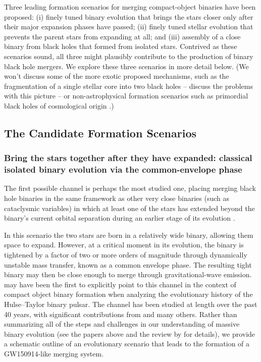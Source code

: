 \documentclass[iop,onecolumn]{revtex4}
\begin{document}
Three leading formation scenarios for merging compact-object binaries have been proposed: (i) finely tuned binary evolution that brings the stars closer only after their major expansion phases have passed; (ii) finely tuned stellar evolution that prevents the parent stars from expanding at all; and (iii) assembly of a close binary from black holes that formed from isolated stars. Contrived as these scenarios sound, all three might plausibly contribute to the production of binary black hole mergers. We explore these three scenarios in more detail below. (We won't discuss some of the more exotic proposed mechanisms, such as the fragmentation of a single stellar core into two black holes \citep{Loeb:2016} -- \citet{Woosley:2016,Dai:2017} discuss the problems with this picture -- or non-astrophysical formation scenarios such as primordial black holes of cosmological origin \citep[e.g.,][]{Bird:2016}.)

\subsection{The Candidate Formation Scenarios}
\subsubsection{Bring the stars together after they have expanded: classical isolated binary evolution via the common-envelope phase}
\label{form:isol}

The first possible channel is perhaps the most studied one, placing merging black hole binaries in the same framework as other very close binaries (such as cataclysmic variables) in which at least one of the stars has extended beyond the binary's current orbital separation during an earlier stage of its evolution \citep[e.g.,][]{Paczynski:1976}. 

In this scenario the two stars are born in a relatively wide binary, allowing them space to expand.  However, at a critical moment in its evolution, the binary is tightened by a factor of two or more orders of magnitude through dynamically unstable mass transfer, known as a common envelope phase. The resulting tight binary may then be close enough to merge through gravitational-wave emission.  \citet{SmarrBlandford:1976} may have been the first to explicitly point to this channel in the context of compact object binary formation when analyzing the evolutionary history of the Hulse--Taylor binary pulsar. The channel has been studied at length over the past 40 years, with significant contributions from \citet{TutukovYungelson:1993,Lipunov:1997,BetheBrown:1998,Nelemans:2003,VossTauris:2003,Pfahl:2005,Dewi:2006,Kalogera:2007,OShaughnessy:2008,Dominik:2012,Belczynski:2016,EldridgeStanway:2016} and many others. Rather than summarizing all of the steps and challenges in our understanding of massive binary evolution (see the papers above and the review by \citet{PostnovYungelson:2014} for details), we provide a schematic outline of an evolutionary scenario that leads to the formation of a GW150914-like merging system.
\end{document}
